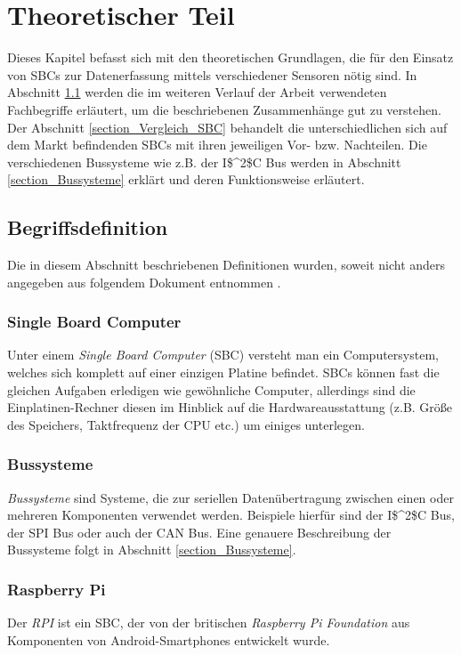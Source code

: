 \chapter{Theoretischer Teil}
\label{chapter_TheoretischerTeil}
Dieses Kapitel befasst sich mit den theoretischen Grundlagen, die für den Einsatz von \acp{SBC} zur Datenerfassung mittels verschiedener Sensoren nötig sind. In Abschnitt \ref{section_Begriffsdefiniton} werden die im weiteren Verlauf der Arbeit verwendeten Fachbegriffe erläutert, um die beschriebenen Zusammenhänge gut zu verstehen. Der Abschnitt \ref{section_Vergleich_SBC} behandelt die unterschiedlichen sich auf dem Markt befindenden \acp{SBC} mit ihren jeweiligen Vor- bzw. Nachteilen. Die verschiedenen Bussysteme wie z.B. der \ac{I$^2$C}  Bus werden in Abschnitt \ref{section_Bussysteme} erklärt und deren Funktionsweise erläutert. 


\section{Begriffsdefinition}
\label{section_Begriffsdefiniton}
Die in diesem Abschnitt beschriebenen Definitionen wurden, soweit nicht anders angegeben aus folgendem Dokument entnommen \citep{Bussysteme_in_der_Praxis}.

\subsection*{Single Board Computer}
Unter einem \textit{Single Board Computer} (\ac{SBC}) versteht man ein Computersystem, welches sich komplett auf einer einzigen Platine befindet. \acp{SBC} können fast die gleichen Aufgaben erledigen wie gewöhnliche Computer, allerdings sind die Einplatinen-Rechner diesen im Hinblick auf die Hardwareausstattung (z.B. Größe des Speichers, Taktfrequenz der CPU etc.) um einiges unterlegen.

\subsection*{Bussysteme}
\textit{Bussysteme} sind Systeme, die  zur seriellen Datenübertragung zwischen einen oder mehreren Komponenten verwendet werden. Beispiele hierfür sind der \ac{I$^2$C} Bus, der \ac{SPI} Bus oder auch der \ac{CAN} Bus. Eine genauere Beschreibung der Bussysteme folgt in Abschnitt \ref{section_Bussysteme}.

\subsection*{Raspberry Pi}
Der \textit{\ac{RPI}} ist ein \ac{SBC}, der von der britischen \textit{Raspberry Pi Foundation} aus Komponenten von Android-Smartphones entwickelt wurde.

